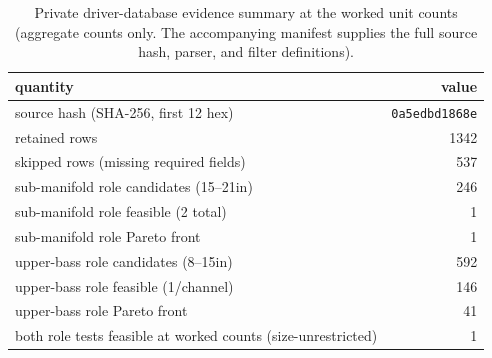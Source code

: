 \begin{table}[htbp]
\centering
\caption{Private driver-database evidence summary at the worked unit counts (aggregate counts only. The accompanying manifest supplies the full source hash, parser, and filter definitions).}
\label{tab:database-summary}
\begin{tabular}{lr}
\toprule
quantity & value\\
\midrule
source hash (SHA-256, first 12 hex) & \texttt{0a5edbd1868e}\\
retained rows & 1342\\
skipped rows (missing required fields) & 537\\
sub-manifold role candidates (15--21in) & 246\\
sub-manifold role feasible (2 total) & 1\\
sub-manifold role Pareto front & 1\\
upper-bass role candidates (8--15in) & 592\\
upper-bass role feasible (1/channel) & 146\\
upper-bass role Pareto front & 41\\
both role tests feasible at worked counts (size-unrestricted) & 1\\
\bottomrule
\end{tabular}
\end{table}

